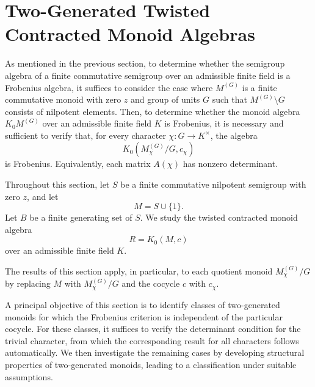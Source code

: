 \documentclass[11pt,reqno]{amsart}
\theoremstyle{plain}
\theoremstyle{remark}
\theoremstyle{definition}
\begin{document}
\section{Two-Generated Twisted Contracted Monoid Algebras}\label{Two-G-A}


As mentioned in the previous section, to determine whether the semigroup algebra of a finite commutative semigroup over an admissible finite field is a Frobenius algebra, it suffices to consider the case where $M^{(G)}$ is a finite commutative monoid with zero $z$ and group of units $G$ such that $M^{(G)}\setminus G$ consists of nilpotent elements. 
Then, to determine whether the monoid algebra $K_0M^{(G)}$ over an admissible finite field $K$ is Frobenius, it is necessary and sufficient to verify that, for every character $\chi:G\to K^\times$, the algebra
\[
K_0(M^{(G)}_{\chi}/G,c_{\chi})
\]
is Frobenius. Equivalently, each matrix $A(\chi)$ has nonzero determinant.

Throughout this section, let $S$ be a finite commutative nilpotent semigroup with zero $z$, and let
\[
M=S\cup\{1\}.
\]
Let $B$ be a finite generating set of $S$. We study the twisted contracted monoid algebra
\[
R=K_0(M,c)
\]
over an admissible finite field $K$.

The results of this section apply, in particular, to each quotient monoid $M^{(G)}_{\chi}/G$ by replacing $M$ with $M^{(G)}_{\chi}/G$ and the cocycle $c$ with $c_{\chi}$.

A principal objective of this section is to identify classes of two-generated monoids for which the Frobenius criterion is independent of the particular cocycle. For these classes, it suffices to verify the determinant condition for the trivial character, from which the corresponding result for all characters follows automatically. We then investigate the remaining cases by developing structural properties of two-generated monoids, leading to a classification under suitable assumptions.
\end{document}
